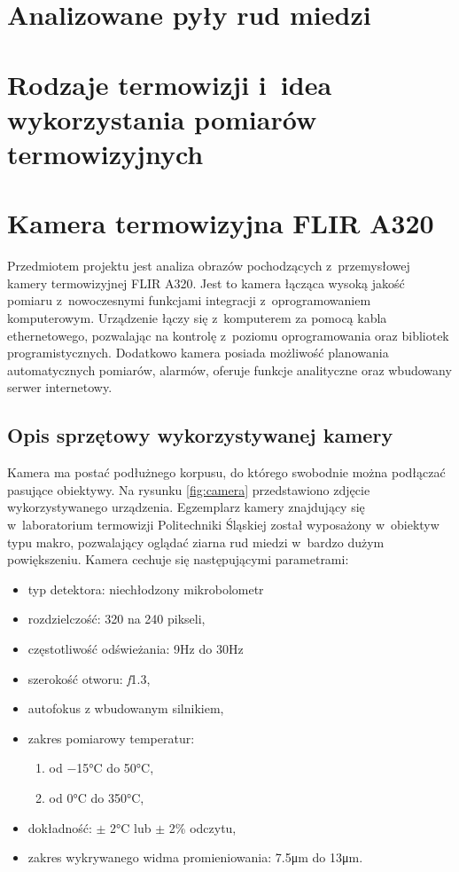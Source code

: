 \section{Analizowane pyły rud miedzi}

\section{Rodzaje termowizji i~idea wykorzystania pomiarów termowizyjnych}

\section{Kamera termowizyjna FLIR A320}
Przedmiotem projektu jest analiza obrazów pochodzących z~przemysłowej
kamery termowizyjnej FLIR A320.
Jest to kamera łącząca wysoką jakość pomiaru z~nowoczesnymi funkcjami
integracji z~oprogramowaniem komputerowym.
Urządzenie łączy się z~komputerem za pomocą kabla ethernetowego,
pozwalając na kontrolę z~poziomu oprogramowania oraz bibliotek
programistycznych.
Dodatkowo kamera posiada możliwość planowania automatycznych pomiarów,
alarmów, oferuje funkcje analityczne oraz wbudowany serwer internetowy.

\subsection{Opis sprzętowy wykorzystywanej kamery}
Kamera ma postać podłużnego korpusu, do którego swobodnie można podłączać
pasujące obiektywy.
Na rysunku \ref{fig:camera} przedstawiono zdjęcie wykorzystywanego urządzenia.
Egzemplarz kamery znajdujący się w~laboratorium termowizji Politechniki
Śląskiej został wyposażony w~obiektyw typu makro, pozwalający oglądać
ziarna rud miedzi w~bardzo dużym powiększeniu.
Kamera cechuje się następującymi parametrami:
\begin{itemize}
	\item typ detektora: niechłodzony mikrobolometr
	\item rozdzielczość: \num{320} na \num{240} pikseli,
	\item częstotliwość odświeżania: \num{9}\si{\hertz} do \num{30}\si{\hertz}
	\item szerokość otworu: \textit{f}\num{1,3},
	\item autofokus z wbudowanym silnikiem,
	\item zakres pomiarowy temperatur: 
		\begin{enumerate}
			\item od \num{-15}\si{\celsius} do \num{+50}\si{\celsius},
			\item od \num{0}\si{\celsius} do \num{350}\si{\celsius},
		\end{enumerate}
	\item dokładność: $\pm$ \num{2}\si{\celsius} lub $\pm$ \num{2}\% odczytu,
	\item zakres wykrywanego widma promieniowania: \num{7,5}\si{\micro\meter}
          do \num{13}\si{\micro\meter}.
\end{itemize}

